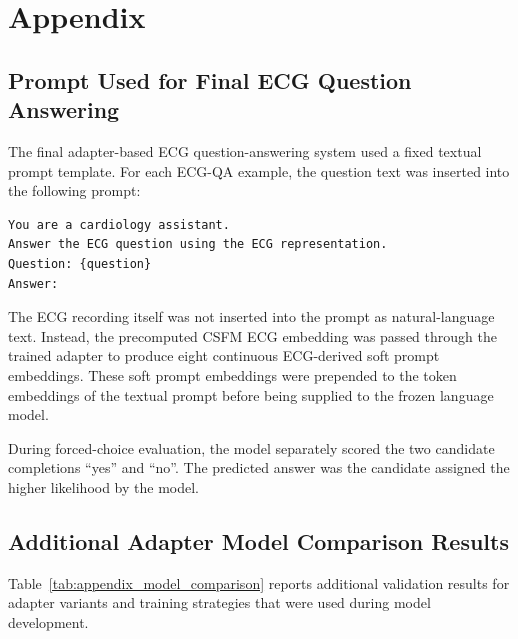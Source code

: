 \section{Appendix}

\subsection{Prompt Used for Final ECG Question Answering}
\label{app:final_prompt}

The final adapter-based ECG question-answering system used a fixed textual prompt template. For each ECG-QA example, the question text was inserted into the following prompt:

\begin{verbatim}
You are a cardiology assistant.
Answer the ECG question using the ECG representation.
Question: {question}
Answer:
\end{verbatim}

The ECG recording itself was not inserted into the prompt as natural-language text. Instead, the precomputed CSFM ECG embedding was passed through the trained adapter to produce eight continuous ECG-derived soft prompt embeddings. These soft prompt embeddings were prepended to the token embeddings of the textual prompt before being supplied to the frozen language model.

During forced-choice evaluation, the model separately scored the two candidate completions ``yes'' and ``no''. The predicted answer was the candidate assigned the higher likelihood by the model.

\subsection{Additional Adapter Model Comparison Results}
\label{app:model_comparison}

Table~\ref{tab:appendix_model_comparison} reports additional validation results for adapter variants and training strategies that were used during model development.

